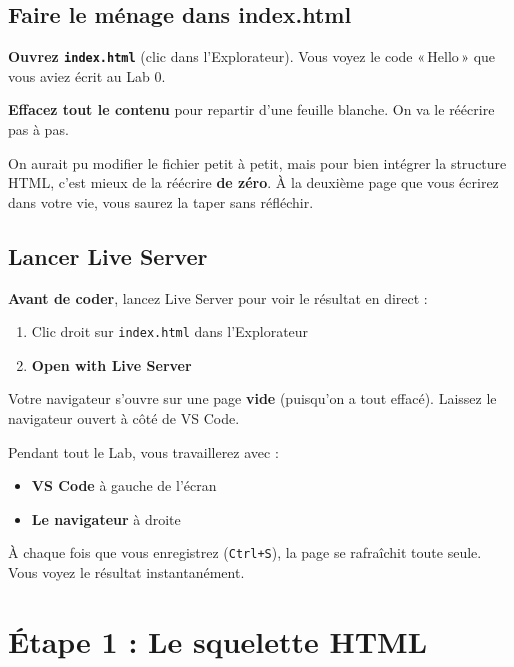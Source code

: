 \documentclass[11pt,a4paper]{article}
\begin{document}
\subsection{Faire le ménage dans index.html}

\textbf{Ouvrez \texttt{index.html}} (clic dans l'Explorateur). Vous voyez
le code «\,Hello\,» que vous aviez écrit au Lab 0.

\textbf{Effacez tout le contenu} pour repartir d'une feuille blanche. On
va le réécrire pas à pas.

\begin{infobox}
On aurait pu modifier le fichier petit à petit, mais pour bien intégrer la
structure HTML, c'est mieux de la réécrire \textbf{de zéro}. À la
deuxième page que vous écrirez dans votre vie, vous saurez la taper sans
réfléchir.
\end{infobox}

\subsection{Lancer Live Server}

\textbf{Avant de coder}, lancez Live Server pour voir le résultat en
direct :
\begin{enumerate}[nosep]
    \item Clic droit sur \texttt{index.html} dans l'Explorateur
    \item \textbf{Open with Live Server}
\end{enumerate}

Votre navigateur s'ouvre sur une page \textbf{vide} (puisqu'on a tout
effacé). Laissez le navigateur ouvert à côté de VS Code.

\begin{retenirbox}
Pendant tout le Lab, vous travaillerez avec :
\begin{itemize}[nosep]
    \item \textbf{VS Code} à gauche de l'écran
    \item \textbf{Le navigateur} à droite
\end{itemize}
À chaque fois que vous enregistrez (\texttt{Ctrl+S}), la page se rafraîchit
toute seule. Vous voyez le résultat instantanément.
\end{retenirbox}

\newpage

\section{Étape 1 : Le squelette HTML}
\end{document}
